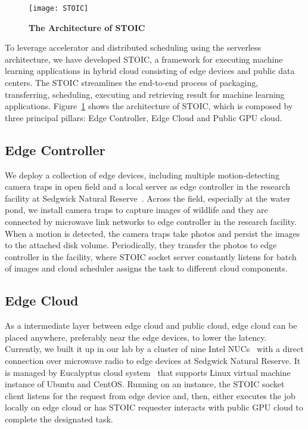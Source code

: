 \begin{figure}
    \centering
    \texttt{[image: STOIC]}
    \caption{\textbf{The Architecture of STOIC}}
    \label{fig:STOIC}
\end{figure}

To leverage accelerator and distributed scheduling using the serverless architecture, we have developed STOIC, a framework for executing machine learning applications in hybrid cloud consisting of edge devices and public data centers. The STOIC streamlines the end-to-end process of packaging, transferring, scheduling, executing and retrieving result for machine learning applications. Figure~\ref{fig:STOIC} shows the architecture of STOIC, which is composed by three principal pillars: Edge Controller, Edge Cloud and Public GPU cloud.

\subsection{Edge Controller}
 We deploy a collection of edge devices, including multiple motion-detecting camera traps in open field and a local server as edge controller in the research facility at Sedgwick Natural Reserve~\cite{ref:sedgwick}. Across the field, especially at the water pond, we install camera traps to capture images of wildlife and they are connected by microwave link networks to edge controller in the research facility. When a motion is detected, the camera traps take photos and persist the images to the attached disk volume. Periodically, they transfer the photos to edge controller in the facility, where STOIC socket server constantly listens for batch of images and cloud scheduler assigns the task to different cloud components. 
 
 \subsection{Edge Cloud}
 
 As a intermediate layer between edge cloud and public cloud, edge cloud can be placed anywhere, preferably near the edge devices, to lower the latency. Currently, we built it up in our lab by a cluster of nine Intel NUCs~\cite{ref:nucs} with a direct connection over microwave radio to edge devices at Sedgwick Natural Reserve. It is managed by Eucalyptus cloud system~\cite{ref:euca} that supports Linux virtual machine instance of Ubuntu and CentOS. Running on an instance, the STOIC socket client listens for the request from edge device and, then, either executes the job locally on edge cloud or has STOIC requester interacts with public GPU cloud to complete the designated task.
 
